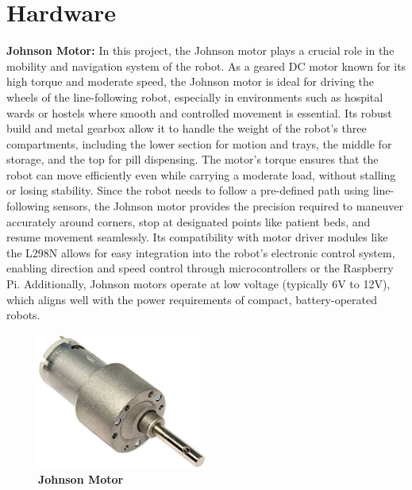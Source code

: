 \section{Hardware}

\textbf{Johnson Motor:} In this project, the Johnson motor plays a crucial role in the mobility and navigation system of the robot. As a geared DC motor known for its high torque and moderate speed, the Johnson motor is ideal for driving the wheels of the line-following robot, especially in environments such as hospital wards or hostels where smooth and controlled movement is essential. Its robust build and metal gearbox allow it to handle the weight of the robot's three compartments, including the lower section for motion and trays, the middle for storage, and the top for pill dispensing. The motor’s torque ensures that the robot can move efficiently even while carrying a moderate load, without stalling or losing stability. Since the robot needs to follow a pre-defined path using line-following sensors, the Johnson motor provides the precision required to maneuver accurately around corners, stop at designated points like patient beds, and resume movement seamlessly. Its compatibility with motor driver modules like the L298N allows for easy integration into the robot’s electronic control system, enabling direction and speed control through microcontrollers or the Raspberry Pi. Additionally, Johnson motors operate at low voltage (typically 6V to 12V), which aligns well with the power requirements of compact, battery-operated robots.

\begin{figure}[htbp!]
\centering
\includegraphics[width=0.5\textwidth]{images/3.1.jpg}
\caption{\textbf{Johnson Motor}}
\label{fig:3.1}
\end{figure}

\vspace{1.5\baselineskip} %


